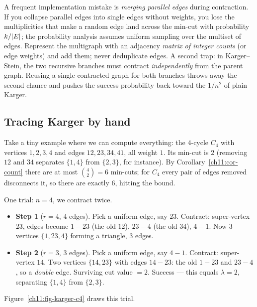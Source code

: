 \begin{trapbox}
A frequent implementation mistake is \emph{merging parallel edges} during contraction. If you collapse parallel edges into single edges without weights, you lose the multiplicities that make a random edge land across the min-cut with probability $k/\lvert E\rvert$; the probability analysis assumes uniform sampling over the multiset of edges. Represent the multigraph with an adjacency \emph{matrix of integer counts} (or edge weights) and add them; never deduplicate edges. A second trap: in Karger--Stein, the two recursive branches must contract \emph{independently} from the parent graph. Reusing a single contracted graph for both branches throws away the second chance and pushes the success probability back toward the $1/n^2$ of plain Karger.
\end{trapbox}

\subsection{Tracing Karger by hand}

Take a tiny example where we can compute everything: the $4$-cycle $C_4$ with vertices $1,2,3,4$ and edges $12,23,34,41$, all weight $1$. Its min-cut is $2$ (removing $12$ and $34$ separates $\{1,4\}$ from $\{2,3\}$, for instance). By Corollary~\ref{ch11:cor-count} there are at most $\binom42=6$ min-cuts; for $C_4$ every pair of edges removed disconnects it, so there are exactly $6$, hitting the bound.

One trial: $n=4$, we contract twice.
\begin{itemize}
  \item \textbf{Step 1} ($r=4$, $4$ edges). Pick a uniform edge, say $23$. Contract: super-vertex $23$, edges become $1{-}23$ (the old $12$), $23{-}4$ (the old $34$), $4{-}1$. Now $3$ vertices $\{1, 23, 4\}$ forming a triangle, $3$ edges.
  \item \textbf{Step 2} ($r=3$, $3$ edges). Pick a uniform edge, say $4{-}1$. Contract: super-vertex $14$. Two vertices $\{14, 23\}$ with edges $14{-}23$: the old $1{-}23$ and $23{-}4$, so a \emph{double} edge. Surviving cut value $=2$. Success --- this equals $\lambda=2$, separating $\{1,4\}$ from $\{2,3\}$.
\end{itemize}
Figure~\ref{ch11:fig-karger-c4} draws this trial.

